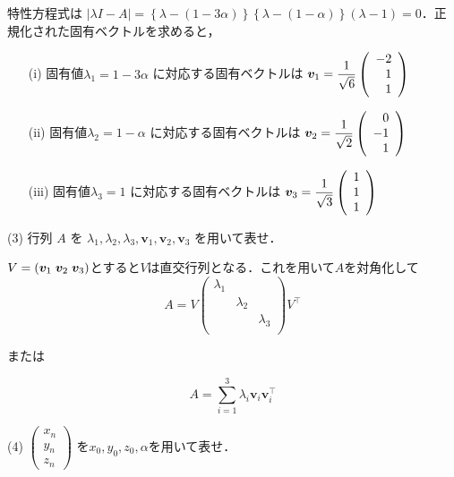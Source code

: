 \documentclass[a4j]{jarticle}
\let \ds \displaystyle
\begin{document}
特性方程式は $\left|\lambda I - A\right| =\left\{\lambda-(1-3\alpha)\right\} \left\{\lambda-(1-\alpha)\right\}(\lambda-1)=0$．正規化された固有ベクトルを求めると，
\begin{itemize}
 \item[(i)] 固有値$\lambda_1=1-3\alpha$ に対応する固有ベクトルは $\ds \bm{v}_1=\frac{1}{\sqrt{6}}\left(\begin{array}[tb]{r}-2\\1\\1 \end{array}\right)$
 \item[(ii)] 固有値$\lambda_2=1-\alpha$ に対応する固有ベクトルは $\ds \bm{v}_2=\frac{1}{\sqrt{2}}\left(\begin{array}[tb]{r}0\\-1\\1 \end{array}\right)$
 \item[(iii)] 固有値$\lambda_3=1$ に対応する固有ベクトルは $\ds \bm{v}_3=\frac{1}{\sqrt{3}}\left(\begin{array}[tb]{r}1\\1\\1 \end{array}\right)$
\end{itemize}

\begin{screen}
 (3) 行列 $A$ を $\lambda_1,\lambda_2,\lambda_3,\bm{v}_1,\bm{v}_2,\bm{v}_3$ を用いて表せ．
\end{screen}

$V = (\bm{v}_1\hspace{1mm}\bm{v}_2\hspace{1mm}\bm{v}_3)$とすると$V$は直交行列となる．これを用いて$A$を対角化して
$$A=V
\begin{pmatrix}
 \lambda_1 & & \\
 &\lambda_2 & \\
 & & \lambda_3 \\
\end{pmatrix}V^\top$$

または

$$A = \sum_{i=1}^3 \lambda_i \bm{v}_i\bm{v}_i^\top$$

\begin{screen}
 (4) $\begin{pmatrix} x_n \\ y_n \\ z_n \end{pmatrix}$ を$x_0,y_0,z_0,\alpha$を用いて表せ．
\end{screen}
\end{document}
